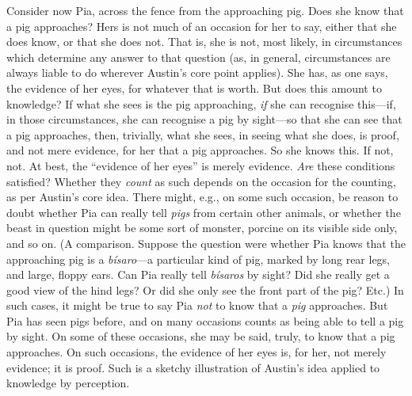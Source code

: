 Consider now Pia, across the fence from the approaching pig. Does she know that a pig approaches? Hers is not much of an occasion for her to say, either that she does know, or that she does not. That is, she is not, most likely, in circumstances which determine any answer to that question (as, in general, circumstances are always liable to do wherever Austin’s core point applies). She has, as one says, the evidence of her eyes, for whatever that is worth. But does this amount to knowledge? If what she sees is the pig approaching, \emph{if} she can recognise this---if, in those circumstances, she can recognise a pig by sight---so that she can see that a pig approaches, then, trivially, what she sees, in seeing what she does, is proof, and not mere evidence, for her that a pig approaches. So she knows this. If not, not. At best, the ``evidence of her eyes'' is merely evidence. \emph{Are} these conditions satisfied? Whether they \emph{count} as such depends on the occasion for the counting, as per Austin’s core idea. There might, e.g., on some such occasion, be reason to doubt whether Pia can really tell \emph{pigs} from certain other animals, or whether the beast in question might be some sort of monster, porcine on its visible side only, and so on. (A comparison. Suppose the question were whether Pia knows that the approaching pig is a \emph{bísaro}---a particular kind of pig, marked by long rear legs, and large, floppy ears. Can Pia really tell \emph{bísaros} by sight? Did she really get a good view of the hind legs? Or did she only see the front part of the pig? Etc.) In such cases, it might be true to say Pia \emph{not} to know that a \emph{pig} approaches. But Pia has seen pigs before, and on many occasions counts as being able to tell a pig by sight. On some of these occasions, she may be said, truly, to know that a pig approaches. On such occasions, the evidence of her eyes is, for her, not merely evidence; it is proof. Such is a sketchy illustration of Austin’s idea applied to knowledge by perception.

